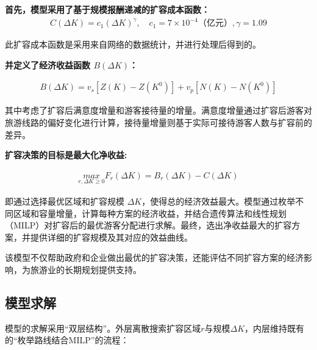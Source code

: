 \noindent\textbf{首先，模型采用了基于规模报酬递减的扩容成本函数：}
\begin{equation}
  \begin{aligned}
    C(\Delta K)=c_{1}(\Delta K)^{\gamma}, \quad c_{1} =7\times 10^{-4}\text{（亿元）}, \gamma = 1.09
  \end{aligned}
\end{equation}

此扩容成本函数是采用来自网络的数据统计，并进行处理后得到的。

\noindent\textbf{并定义了经济收益函数 $B(\Delta K)$：}

\begin{equation}
  \begin{aligned}
    B(\Delta K) = v_{s}[Z(K)-Z(K^0)]+v_{p}[N(K)-N(K^{0})]
  \end{aligned}
\end{equation}

其中考虑了扩容后满意度增量和游客接待量的增量。满意度增量通过扩容后游客对旅游线路的偏好变化进行计算，接待量增量则基于实际可接待游客人数与扩容前的差异。

\noindent\textbf{扩容决策的目标是最大化净收益:}

\begin{equation}
  \begin{aligned}
    \underset{r,\Delta K\geq 0}{max}  F_r(\Delta K) = B_r(\Delta K) - C(\Delta K)
  \end{aligned}
\end{equation}

即通过选择最优区域和扩容规模 $\Delta K$，使得总的经济效益最大。模型通过枚举不同区域和容量增量，计算每种方案的经济收益，并结合遗传算法和线性规划（MILP）对扩容后的最优游客分配进行求解。最终，选出净收益最大的扩容方案，并提供详细的扩容规模及其对应的效益曲线。



该模型不仅帮助政府和企业做出最优的扩容决策，还能评估不同扩容方案的经济影响，为旅游业的长期规划提供支持。

\subsection[\hspace{-2pt}模型求解]{{\heiti{}\hspace{-8pt}模型求解}}\label{subsec:3-model-build}

模型的求解采用“双层结构”。外层离散搜索扩容区域$r$与规模$\Delta K$，内层维持既有的“枚举路线结合MILP”的流程：


